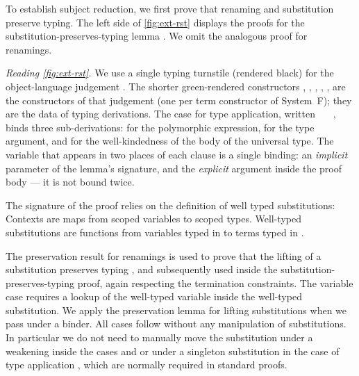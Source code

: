 \documentclass[a4paper,UKenglish,cleveref, autoref, thm-restate,anonymous]{lipics-v2021}
\begin{document}
To establish subject reduction, we first prove that renaming and substitution
preserve typing. The left side of \cref{fig:ext-rst} displays the proofs for
the substitution-preserves-typing lemma . We omit the
analogous proof for renamings.

\textit{Reading \cref{fig:ext-rst}.} We use a single typing turnstile
 (rendered black) for the object-language judgement
. The shorter green-rendered constructors
, ,
, ,
,  are the
constructors of that judgement (one per term constructor of System~F);
they are the data of typing derivations. The case for type application,
written ~~~,
binds three sub-derivations:  for the polymorphic
expression,  for the type argument, and 
for the well-kindedness of the body of the universal type. The variable
 that appears in two places of each clause is a single
binding: an \emph{implicit} parameter of the lemma's signature, and the
\emph{explicit} argument inside the proof body --- it is not bound twice.

The signature of the proof relies on the definition of well typed
substitutions: \EWTS{} Contexts   are maps from
scoped variables to scoped types. Well-typed substitutions are functions from
variables  typed in  to terms 
  typed in .

The preservation result for renamings is used to prove that the lifting of a
substitution preserves typing , and subsequently used inside
the substitution-preserves-typing proof, again respecting the termination
constraints. The variable case requires a lookup of the well-typed variable
inside the well-typed substitution. We apply the preservation lemma for lifting
substitutions when we pass under a binder. All cases follow without any
manipulation of substitutions. In particular we do not need to manually move
the substitution under a weakening inside the cases
 and  or under a
singleton substitution in the case of type application
, which are normally required in standard
proofs.
\end{document}
